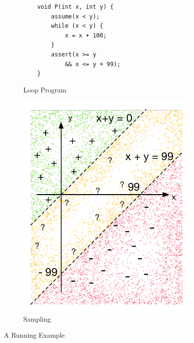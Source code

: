 \begin{figure}[t]
\begin{subfigure}{0.245\textwidth}
    \centering
    \vspace{1.5cm}
    {\scriptsize\begin{verbatim}
    void P(int x, int y) {
        assume(x < y);
        while (x < y) {
            x = x + 100;
        }
        assert(x >= y
            && x <= y + 99);
    }
    \end{verbatim}}
    \vspace{0.5cm}
    \caption{Loop Program}
    \label{fig:loop:program}
\end{subfigure}%
\begin{subfigure}{.245\textwidth}
      \centering
      \includegraphics[scale=0.43]{figures/running-sampling.pdf}
      \caption{Sampling}
      \label{figure:running:example:sampling}
\end{subfigure}
\caption{A Running Example}
\label{fig:running:example}
\end{figure}

